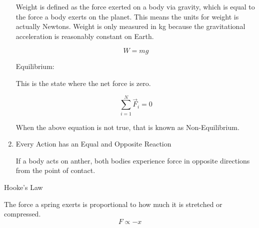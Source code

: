 \documentclass{report}
\begin{document}
\begin{description}
\begin{enumerate}
\begin{mdframed}
                    \vspace{10pt}

                    Weight is defined as the force exerted on a body
                    via gravity, which is equal to the force a body
                    exerts on the planet. This means the units for
                    weight is actually Newtons. Weight is only measured
                    in kg because the gravitational acceleration is
                    reasonably constant on Earth.

                    \begin{displaymath}
                        W = mg
                    \end{displaymath}
                \end{mdframed}
                \begin{mdframed}
                    Equilibrium:

                    \vspace{10pt}

                    This is the state where the net force is
                    zero.

                    \begin{displaymath}
                        \sum_{i=1}^N \vec{F}_i = 0
                    \end{displaymath}
                    
                    When the above equation is not true, that
                    is known as Non-Equilibrium.
                \end{mdframed}
            \item Every Action has an Equal and Opposite Reaction
                \begin{mdframed}
                    If a body acts on anther, both bodies experience force
                    in opposite directions from the point of contact.
                \end{mdframed}
        \end{enumerate}
    \item Hooke's Law
        \begin{mdframed}

            The force a spring exerts is proportional to how
            much it is stretched or compressed.
            \begin{displaymath}
                F \propto -x
            \end{displaymath}
            

\end{mdframed}
\end{description}
\end{document}
